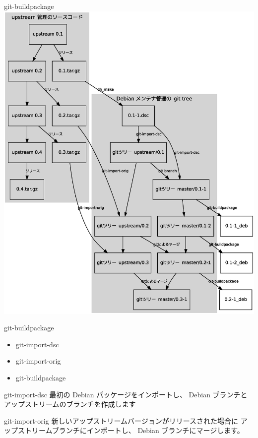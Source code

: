 \documentclass[cjk,dvipdfmx,12pt]{beamer}
\begin{document}
\begin{frame}
 {git-buildpackage}
 \includegraphics[height=1\vsize]{image200704/git-buildpackage.eps}
\end{frame}

\begin{frame}{git-buildpackage}
\begin{itemize}
 \item git-import-dsc
 \item git-import-orig
 \item git-buildpackage
\end{itemize}
\end{frame}

\begin{frame}{git-import-dsc}
 最初の Debian パッケージをインポートし、
 Debian ブランチとアップストリームのブランチを作成します
\end{frame}

\begin{frame}{git-import-orig}
 新しいアップストリームバージョンがリリースされた場合に
 アップストリームブランチにインポートし、
 Debian ブランチにマージします。
\end{frame}
\end{document}

